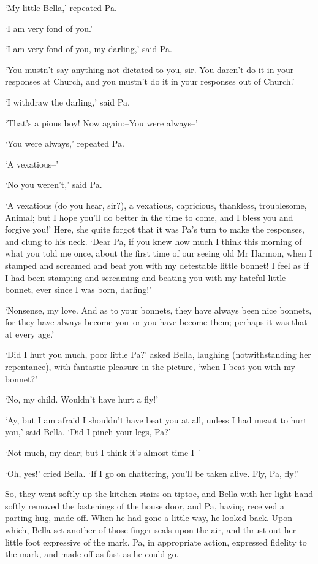 ‘My little Bella,’ repeated Pa.

‘I am very fond of you.’

‘I am very fond of you, my darling,’ said Pa.

‘You mustn’t say anything not dictated to you, sir. You daren’t do it in
your responses at Church, and you mustn’t do it in your responses out of
Church.’

‘I withdraw the darling,’ said Pa.

‘That’s a pious boy! Now again:--You were always--’

‘You were always,’ repeated Pa.

‘A vexatious--’

‘No you weren’t,’ said Pa.

‘A vexatious (do you hear, sir?), a vexatious, capricious, thankless,
troublesome, Animal; but I hope you’ll do better in the time to come,
and I bless you and forgive you!’ Here, she quite forgot that it was
Pa’s turn to make the responses, and clung to his neck. ‘Dear Pa, if you
knew how much I think this morning of what you told me once, about the
first time of our seeing old Mr Harmon, when I stamped and screamed
and beat you with my detestable little bonnet! I feel as if I had been
stamping and screaming and beating you with my hateful little bonnet,
ever since I was born, darling!’

‘Nonsense, my love. And as to your bonnets, they have always been nice
bonnets, for they have always become you--or you have become them;
perhaps it was that--at every age.’

‘Did I hurt you much, poor little Pa?’ asked Bella, laughing
(notwithstanding her repentance), with fantastic pleasure in the
picture, ‘when I beat you with my bonnet?’

‘No, my child. Wouldn’t have hurt a fly!’

‘Ay, but I am afraid I shouldn’t have beat you at all, unless I had
meant to hurt you,’ said Bella. ‘Did I pinch your legs, Pa?’

‘Not much, my dear; but I think it’s almost time I--’

‘Oh, yes!’ cried Bella. ‘If I go on chattering, you’ll be taken alive.
Fly, Pa, fly!’

So, they went softly up the kitchen stairs on tiptoe, and Bella with
her light hand softly removed the fastenings of the house door, and Pa,
having received a parting hug, made off. When he had gone a little way,
he looked back. Upon which, Bella set another of those finger seals upon
the air, and thrust out her little foot expressive of the mark. Pa, in
appropriate action, expressed fidelity to the mark, and made off as fast
as he could go.

